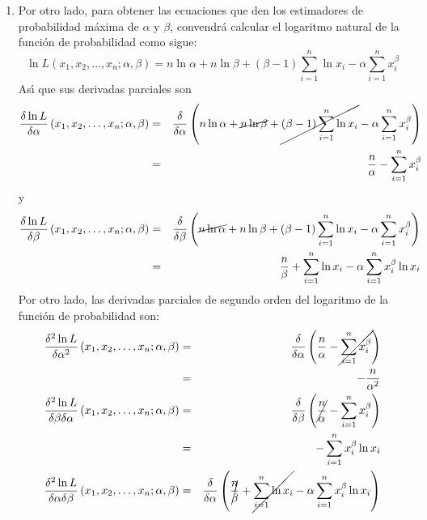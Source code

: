 \begin{solucion}
\begin{enumerate}
  \item Por otro lado, para obtener las ecuaciones que den los estimadores de probabilidad m\'axima de $\alpha$ y $\beta$, convendr\'a calcular el logaritmo natural de la funci\'on de probabilidad como sigue:
  \begin{equation*}
   \ln L\left( x_1, x_2, \ldots, x_n; \alpha, \beta \right) = n\ln \alpha + n\ln \beta + (\beta - 1) \sum_{i=1}^{n} \ln x_i - \alpha \sum_{i=1}^n x_i^\beta
  \end{equation*}
  As\'{\i} que sus derivadas parciales son
  \begin{eqnarray*}
   \frac{\delta \ln L}{\delta \alpha} \left( x_1, x_2, \ldots, x_n; \alpha, \beta \right) & = & \frac{\delta}{\delta \alpha} \left( n\ln \alpha + \cancel{ n\ln \beta } + \cancel{ (\beta - 1) \sum_{i=1}^{n} \ln x_i } - \alpha \sum_{i=1}^n x_i^\beta \right) \\ 
   & = & \frac{n}{\alpha} - \sum_{i=1}^n x_i^\beta
  \end{eqnarray*}
  y
  \begin{eqnarray*}
   \frac{\delta \ln L}{\delta \beta} \left( x_1, x_2, \ldots, x_n; \alpha, \beta \right) & = & \frac{\delta}{\delta \beta} \left( \cancel{n\ln \alpha} + n\ln \beta + (\beta - 1) \sum_{i=1}^{n} \ln x_i - \alpha \sum_{i=1}^n x_i^\beta \right) \\ 
   & = & \frac{n}{\beta} + \sum_{i=1}^{n} \ln x_i - \alpha \sum_{i=1}^n x_i^\beta \ln x_i 
  \end{eqnarray*}
  Por otro lado, las derivadas parciales de segundo orden del logaritmo de la funci\'on de probabilidad son:
  \begin{eqnarray*}
   \frac{\delta^2 \ln L}{\delta \alpha^2} \left( x_1, x_2, \ldots, x_n; \alpha, \beta \right) & = & \frac{\delta}{\delta \alpha} \left( \frac{n}{\alpha} - \cancel{ \sum_{i=1}^n x_i^\beta } \right) \\
   & = & - \frac{n}{\alpha^2} \\
   \frac{\delta^2 \ln L}{\delta \beta \delta \alpha} \left( x_1, x_2, \ldots, x_n; \alpha, \beta \right) & = & \frac{\delta}{\delta \beta} \left( \cancel{ \frac{n}{\alpha} } - \sum_{i=1}^n x_i^\beta  \right) \\
   & = & - \sum_{i=1}^n x_i^\beta \ln x_i \\
   \frac{\delta^2 \ln L}{\delta \alpha \delta \beta} \left( x_1, x_2, \ldots, x_n; \alpha, \beta \right) & = & \frac{\delta}{\delta \alpha} \left( \cancel{ \frac{n}{\beta} } + \cancel{ \sum_{i=1}^{n} \ln x_i } - \alpha \sum_{i=1}^n x_i^\beta \ln x_i \right) \\ 

\end{eqnarray*}
\end{enumerate}
\end{solucion}
